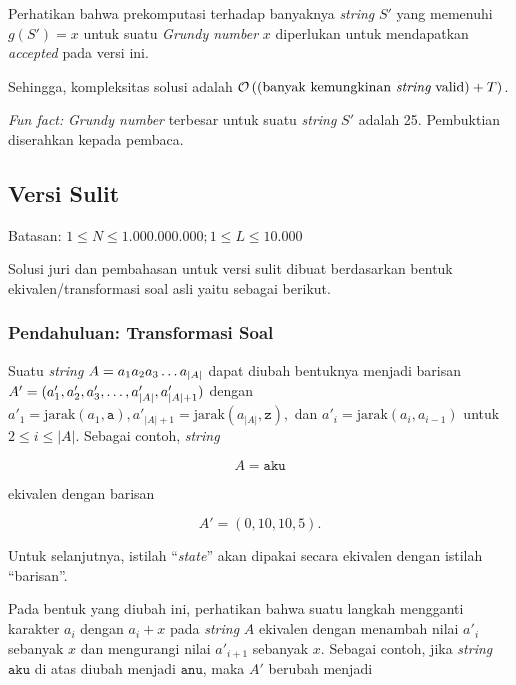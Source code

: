 \documentclass[../main_editorial.tex]{subfiles} %
\begin{document}
Perhatikan bahwa prekomputasi terhadap banyaknya \textit{string} $ S' $ yang memenuhi $ g(S') = x $ untuk suatu \textit{Grundy number} $ x $ diperlukan untuk mendapatkan \textit{accepted} pada versi ini.

Sehingga, kompleksitas solusi adalah $ \bigO{(\mathrm{banyak\ kemungkinan\ \textit{string}\ valid}) + T} $.

\textit{Fun fact:} \textit{Grundy number} terbesar untuk suatu \textit{string} $ S' $ adalah 25. Pembuktian diserahkan kepada pembaca.

\subsection*{Versi Sulit}

Batasan: $ 1 \le N \le 1.000.000.000; 1 \le L \le 10.000 $

Solusi juri dan pembahasan untuk versi sulit dibuat berdasarkan bentuk ekivalen/transformasi soal asli yaitu sebagai berikut.

\subsubsection*{Pendahuluan: Transformasi Soal}

Suatu \textit{string} $ A = a_1a_2a_3\mathellipsis a_{|A|} $ dapat diubah bentuknya menjadi barisan $ A' = (a'_1, a'_2, a'_3, \mathellipsis, a'_{|A|}, a'_{|A|+1}) $ dengan $ a'_1 = \mathrm{jarak}(a_1, \mathtt{a}), a'_{|A|+1} = \mathrm{jarak}(a_{|A|}, \mathtt{z}), $ dan $ a'_i = \mathrm{jarak}(a_i, a_{i-1}) $ untuk $ 2 \le i \le |A| $. Sebagai contoh, \textit{string}

$$
A = \mathtt{aku}
$$

ekivalen dengan barisan

$$
A' = (0, 10, 10, 5).
$$

Untuk selanjutnya, istilah ``\textit{state}'' akan dipakai secara ekivalen dengan istilah ``barisan''.

Pada bentuk yang diubah ini, perhatikan bahwa suatu langkah mengganti karakter $ a_i $ dengan $ a_i+x $ pada \textit{string} $ A $ ekivalen dengan menambah nilai $ a'_i $ sebanyak $ x $ dan mengurangi nilai $ a'_{i + 1} $ sebanyak $ x $. Sebagai contoh, jika \textit{string} $ \mathtt{aku} $ di atas diubah menjadi $ \mathtt{anu} $, maka $ A' $ berubah menjadi
\end{document}
